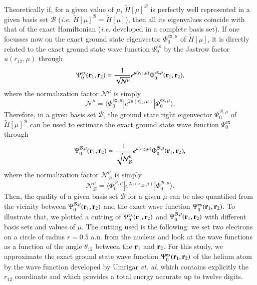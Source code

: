 \documentclass[aip,jcp,reprint,noshowkeys,superscriptaddress]{revtex4-1}
\newcommand{\matelem}[3]{\langle #1 | #2 | #3 \rangle}
\newcommand{\br}[0]{{\bf {r}}}
\newcommand{\bri}[1]{{\bf r}_{#1}}
\newcommand{\psiex}[0]{\Psi^{\text{ex}}_0}
\newcommand{\phimu}[0]{\Phi^{\text{ex},\mu}_0}
\newcommand{\phimub}[0]{\Phi^{\mathcal{B},\mu}_0}
\newcommand{\psimub}[0]{\Psi^{\mathcal{B},\mu}_0}
\newcommand{\basis}[0]{\mathcal{B}}
\begin{document}
Theoretically if, for a given value of $\mu$, $\tilde{H}[\mu]^{\basis}$ is perfectly well represented in a given basis set $\mathcal{B}$ (\textit{i.e.} $\tilde{H}[\mu]^{\basis} = \tilde{H}[\mu]$), then all its eigenvalues coincide with that of the exact Hamiltonian (\textit{i.e.} developed in a complete basis set). If one focusses now on the exact ground state eigenvector $\phimu$ of $\tilde{H}[\mu]$, it is directly related to the exact ground state wave function $\psiex$ by the Jastrow factor $u(r_{12},\mu)$ through 
\begin{equation}
 \psiex(\br{}_1,\br{}_2) =  \frac{1}{\sqrt{\mathcal{N}^{\mu}}} e^{u(r_{12},\mu)} \phimu(\br{}_1,\br{}_2), 
\end{equation}
where the normalization factor $\mathcal{N}^{\mu}$ is simply 
\begin{equation}
  \mathcal{N}^{\mu} = \matelem{\phimu}{e^{2 u(r_{12},\mu)}}{\phimu}.
\end{equation}
Therefore, in a given basis set $\basis$, the ground state right eigenvector $\phimub$ of $\tilde{H}[\mu]^{\basis}$ can be used to estimate the exact ground state wave function $\psiex$ through 
\begin{equation}
 \psimub(\br{}_1,\br{}_2) = \frac{1}{\sqrt{\mathcal{N}_{\basis}^{\mu}}}e^{u(r_{12},\mu)}\phimub(\br{}_1,\br{}_2),
\end{equation}
where the normalization factor $\mathcal{N}_{\basis}^{\mu}$ is simply
\begin{equation}
  \mathcal{N}_{\basis}^{\mu} = \matelem{\phimub}{e^{2 u(r_{12},\mu)}}{\phimub}.
\end{equation}
Then, the quality of a given basis set $\basis$ for a given $\mu$ can be also quantified from the vicinity between $\psimub(\br{}_1,\br{}_2)$ and the exact wave function $\psiex(\br{}_1,\br{}_2)$. 
To illustrate that, 
we plotted a cutting of $\psiex(\br{}_1,\br{}_2)$ and  $\psimub(\br{}_1,\br{}_2) $ with different basis sets and values of $\mu$. The cutting used is the following: we set two electrons on a circle of radius $r=0.5$ a.u. from the nucleus and look at the wave functions as a function of the angle $\theta_{12}$ between the $\bri{1}$ and $\bri{2}$. 
For this study, we approximate the exact ground state wave function $\psiex(\br{}_1,\br{}_2)$ of the helium atom by the wave function developed by Umrigar \textit{et. al.}\cite{UmrGon-PRA-94} which contains explicitly the $r_{12}$ coordinate and which provides a total energy accurate up to twelve digits.  
\end{document}
